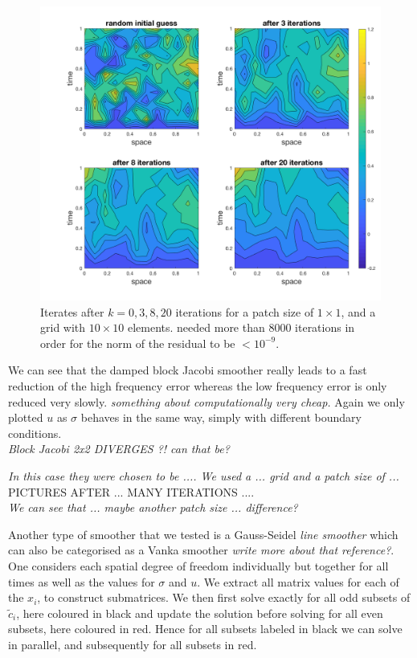 \documentclass[../draft_1.tex]{subfiles}
\begin{document}

\begin{figure}[ht!]
	\centering
	\includegraphics[scale=0.28]{images/implementation/contour_plot_1_blk_size1by1}
	\caption{Iterates after $k = 0,3,8, 20$ iterations for a patch size of $1 \times 1$, and a grid with $10 \times 10$ elements. needed more than 8000 iterations in order for the norm of the residual to be $< 10^{-9}$.}
\end{figure}

We can see that the damped block Jacobi smoother really leads to a fast reduction of the high frequency error whereas the low frequency error is only reduced very slowly. \textit{something about computationally very cheap.} Again we only plotted $u$ as $\sigma$ behaves in the same way, simply with different boundary conditions. \\

\textit{Block Jacobi 2x2 DIVERGES ?! can that be?}



\textit{In this case they were chosen to be .... We used a ... grid and a patch size of ...}
\bigskip
\\
PICTURES AFTER ... MANY ITERATIONS ....
\bigskip
\\
\textit{We can see that ... maybe another patch size ... difference?}

Another type of smoother that we tested is a Gauss-Seidel \textit{line smoother} \cite{adams2001distributed} which can also be categorised as a Vanka smoother  \textit{write more about that reference?}. One considers each spatial degree of freedom individually but together for all times as well as the values for $\sigma$ and $u$. We extract all matrix values for each of the $x_i$, to construct submatrices. We then first solve exactly for all odd subsets of $\tilde{c}_i$, here coloured in black and update the solution before solving for all even subsets, here coloured in red. Hence for all subsets labeled in black we can solve in parallel, and subsequently for all subsets in red. 
\end{document}
